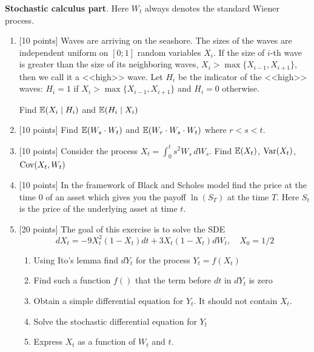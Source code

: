 \documentclass[pdftex,12pt,a4paper]{article}
\begin{document}
\vspace{20pt}

\textbf{Stochastic calculus part}. Here $W_t$ always denotes the standard Wiener process. 

\vspace{20pt}

\begin{enumerate}[resume]
\item $[$10 points] Waves are arriving on the seashore. The sizes of the waves are independent uniform on $[0;1]$ random variables $X_i$. If the size of $i$-th wave is greater than the size of its neighboring waves, $X_i>\max\{X_{i-1},X_{i+1}\}$, then we call it a <<high>> wave. Let $H_i$ be the indicator of the <<high>> waves: $H_i=1$ if $X_i>\max\{X_{i-1},X_{i+1}\}$ and $H_i=0$ otherwise.

Find $\mathbb{E}(X_i \mid H_i)$ and $\mathbb{E}(H_i \mid X_i)$ 
\item $[$10 points] Find $\mathbb{E}(W_s \cdot W_t)$ and $\mathbb{E}(W_r \cdot W_s \cdot W_t)$ where $r<s<t$.
\item $[$10 points] Consider the process $X_t=\int_0^t s^2 W_s\,dW_s$. Find $\mathbb{E}(X_t)$, $\operatorname{Var}(X_t)$, $\operatorname{Cov}(X_t,W_t)$
\item $[$10 points] In the framework of Black and Scholes model find the price at the time $0$ of an asset which gives you the payoff $\ln(S_T)$ at the time $T$. Here $S_t$ is the price of the underlying asset at time $t$.

\item $[$20 points] The goal of this exercise is to solve the SDE
\[
dX_t=-9X_t^2(1-X_t)dt+3X_t(1-X_t)dW_t,\quad X_0=1/2
\]
\begin{enumerate}
\item Using Ito's lemma find $dY_t$ for the process $Y_t=f(X_t)$ 
\item Find such a function $f()$ that the term before $dt$ in $dY_t$ is zero
\item Obtain a simple differential equation for $Y_t$. It should not contain $X_t$.
\item Solve the stochastic differential equation for $Y_t$
\item Express $X_t$ as a function of $W_t$ and $t$.
\end{enumerate}

\end{enumerate}
\end{document}
